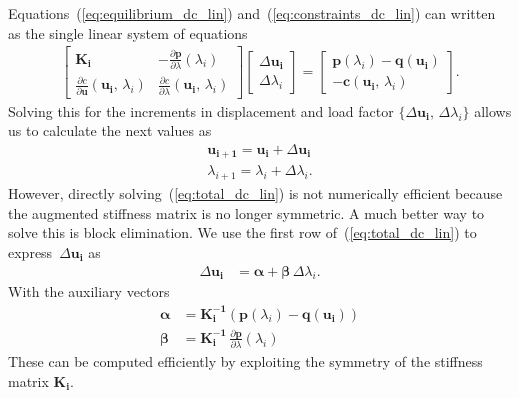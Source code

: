 Equations~(\ref{eq:equilibrium_dc_lin}) and~(\ref{eq:constraints_dc_lin}) can written as the single linear system of equations
%
\begin{align}
\begin{bmatrix}
\boldsymbol{K_{i}} & -\frac{\partial \boldsymbol{p}}{\partial \lambda}(\lambda_i)\\
\frac{\partial c}{\partial \boldsymbol{u}}(\boldsymbol{u_{i}},\,\lambda_{i}) & \frac{\partial c}{\partial \lambda}(\boldsymbol{u_{i}},\,\lambda_{i})
\end{bmatrix}
\begin{bmatrix}
\Delta\boldsymbol{u_{i}}\\
\Delta \lambda_{i}
\end{bmatrix}
=
\begin{bmatrix}
\boldsymbol{p}(\lambda_i) - \boldsymbol{q}(\boldsymbol{u_{i}})\\
-\boldsymbol{c}(\boldsymbol{u_{i}},\,\lambda_{i})
\end{bmatrix}.\label{eq:total_dc_lin}
\end{align}
%
Solving this for the increments in displacement and load factor $\{\Delta\boldsymbol{u_{i}},\,\Delta \lambda_{i}\}$ allows us to calculate the next values as
%
\begin{align}
\boldsymbol{u_{i+1}} = \boldsymbol{u_{i}} + \Delta\boldsymbol{u_{i}}\label{eq:step_u}\\
\lambda_{i+1} = \lambda_{i} + \Delta \lambda_{i}.\label{eq:step_lambda}
\end{align}
%
However, directly solving~(\ref{eq:total_dc_lin}) is not  numerically efficient because the augmented stiffness matrix is no longer symmetric. A much better way to solve this is block elimination. We use the first row of~(\ref{eq:total_dc_lin}) to express~$\Delta\boldsymbol{u_{i}}$ as
%
\begin{align}
\Delta\boldsymbol{u_{i}} &= \boldsymbol{\alpha} + \boldsymbol{\beta}\,\Delta \lambda_{i}.\label{eq:auxiliary_disp_dc}
\end{align}
%
With the auxiliary vectors
%
\begin{align}
\boldsymbol{\alpha} &= \boldsymbol{K_{i}^{-1}}(\boldsymbol{p}(\lambda_i) - \boldsymbol{q}(\boldsymbol{u_{i}}))\label{eq:auxiliary_1}\\
\boldsymbol{\beta} &= \boldsymbol{K_{i}^{-1}}\,\frac{\partial \boldsymbol{p}}{\partial \lambda}(\lambda_i)\label{eq:auxiliary_2}
\end{align}
%
These can be computed efficiently by exploiting the symmetry of the stiffness matrix $\boldsymbol{K_{i}}$.
